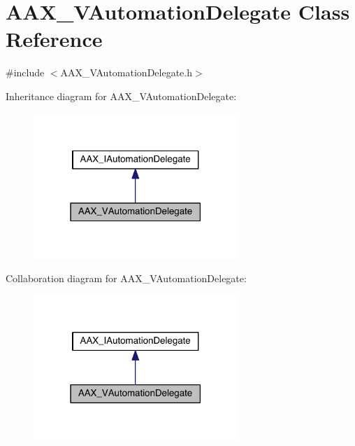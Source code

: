\hypertarget{a00129}{}\section{A\+A\+X\+\_\+\+V\+Automation\+Delegate Class Reference}
\label{a00129}


{\ttfamily \#include $<$A\+A\+X\+\_\+\+V\+Automation\+Delegate.\+h$>$}



Inheritance diagram for A\+A\+X\+\_\+\+V\+Automation\+Delegate\+:
\nopagebreak
\begin{figure}[H]
\begin{center}
\leavevmode
\includegraphics[width=219pt]{a00683}
\end{center}
\end{figure}


Collaboration diagram for A\+A\+X\+\_\+\+V\+Automation\+Delegate\+:
\nopagebreak
\begin{figure}[H]
\begin{center}
\leavevmode
\includegraphics[width=219pt]{a00684}
\end{center}
\end{figure}


